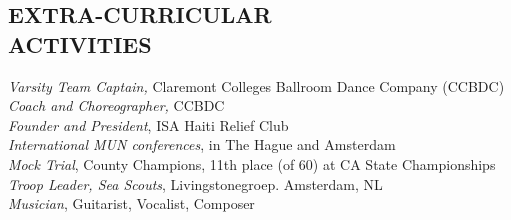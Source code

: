 \documentclass[margin, 10pt]{res} %
\begin{document}
\begin{resume}
\vspace{-0.3em}
\section{EXTRA-CURRICULAR \\ ACTIVITIES} 

\textit{Varsity Team Captain,} Claremont Colleges Ballroom Dance Company (CCBDC)  \\
\textit{Coach and Choreographer,} CCBDC\\
\textit{Founder and President}, ISA Haiti Relief Club \\
\textit{International MUN conferences}, in The Hague and Amsterdam\\
\textit{Mock Trial}, County Champions, 11th place (of 60) at CA State Championships \\
\textit{Troop Leader, Sea Scouts}, Livingstonegroep. Amsterdam, NL\\
\textit{Musician}, Guitarist, Vocalist, Composer \\


\end{resume}
\end{document}
